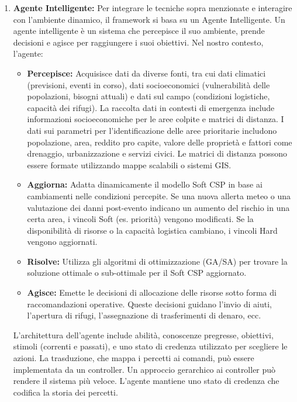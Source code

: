 \documentclass[letterpaper]{article}
\begin{document}
\begin{enumerate}
    \item \textbf{Agente Intelligente:} Per integrare le tecniche sopra menzionate e interagire con l'ambiente dinamico, il framework si basa su un Agente Intelligente. Un agente intelligente è un sistema che percepisce il suo ambiente, prende decisioni e agisce per raggiungere i suoi obiettivi. Nel nostro contesto, l'agente:
          \begin{itemize}
              \item \textbf{Percepisce:} Acquisisce dati da diverse fonti, tra cui dati climatici (previsioni, eventi in corso), dati socioeconomici (vulnerabilità delle popolazioni, bisogni attuali) e dati sul campo (condizioni logistiche, capacità dei rifugi). La raccolta dati in contesti di emergenza include informazioni socioeconomiche per le aree colpite e matrici di distanza. I dati sui parametri per l'identificazione delle aree prioritarie includono popolazione, area, reddito pro capite, valore delle proprietà e fattori come drenaggio, urbanizzazione e servizi civici. Le matrici di distanza possono essere formate utilizzando mappe scalabili o sistemi GIS.
              \item \textbf{Aggiorna:} Adatta dinamicamente il modello Soft CSP in base ai cambiamenti nelle condizioni percepite. Se una nuova allerta meteo o una valutazione dei danni post-evento indicano un aumento del rischio in una certa area, i vincoli Soft (es. priorità) vengono modificati. Se la disponibilità di risorse o la capacità logistica cambiano, i vincoli Hard vengono aggiornati.
              \item \textbf{Risolve:} Utilizza gli algoritmi di ottimizzazione (GA/SA) per trovare la soluzione ottimale o sub-ottimale per il Soft CSP aggiornato.
              \item \textbf{Agisce:} Emette le decisioni di allocazione delle risorse sotto forma di raccomandazioni operative. Queste decisioni guidano l'invio di aiuti, l'apertura di rifugi, l'assegnazione di trasferimenti di denaro, ecc.
          \end{itemize}
          L'architettura dell'agente include abilità, conoscenze pregresse, obiettivi, stimoli (correnti e passati), e uno stato di credenza utilizzato per scegliere le azioni. La trasduzione, che mappa i percetti ai comandi, può essere implementata da un controller. Un approccio gerarchico ai controller può rendere il sistema più veloce. L'agente mantiene uno stato di credenza che codifica la storia dei percetti.
\end{enumerate}
\end{document}
